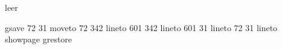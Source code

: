\begin{filecontents}{leer}



gsave
72 31 moveto
72 342 lineto
601 342 lineto
601 31 lineto
72 31 lineto
showpage
grestore
\end{filecontents}
%
\documentclass[epj]{svjour}
%
\usepackage{graphics}

\setcounter{secnumdepth}{3}
\usepackage{verbatim}
\usepackage{bm}
\usepackage{amsmath}
\usepackage{amssymb}
\usepackage{graphicx}
\usepackage{slashed}
\usepackage{wrapfig}
\usepackage{bbm}
\usepackage[caption=false]{subfig}
\usepackage{verbatim}
\usepackage{color}



